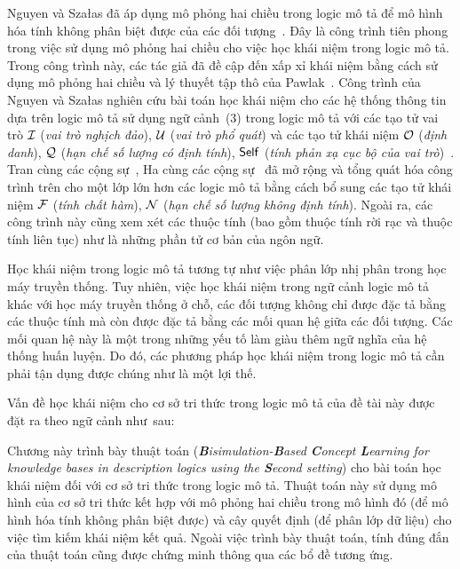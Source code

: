 Nguyen và Sza{\l}as đã áp dụng mô phỏng hai chiều trong logic mô tả để mô hình hóa tính không phân biệt được của các đối tượng~\cite{Nguyen2013}. Đây là công trình tiên phong trong việc sử dụng mô phỏng hai chiều cho việc học khái niệm trong logic mô tả. Trong công trình này, các tác giả đã đề cập đến xấp xỉ khái niệm bằng cách sử dụng mô phỏng hai chiều và lý thuyết tập thô của Pawlak~\cite{Pawlak1992,Pawlak2007}. 
Công trình của Nguyen và Sza{\l}as nghiên cứu bài toán học khái niệm cho các hệ thống thông tin dựa trên logic mô tả sử dụng ngữ cảnh~(3) trong logic mô tả \ALC với các tạo tử vai trò $\mathcal{I}$ ({\em vai trò nghịch đảo}), $\mathcal{U}$ ({\em vai trò phổ quát}) và các tạo tử khái niệm $\mathcal{O}$ ({\em định danh}), $\mathcal{Q}$ ({\em hạn chế số lượng có định tính}), $\mathsf{Self}$ ({\em tính phản xạ cục bộ của vai trò})~\cite{Nguyen2013}.
Tran cùng các cộng sự~\cite{Tran2012}, Ha cùng các cộng sự~\cite{Ha2012} đã mở rộng và tổng quát hóa công trình trên cho một lớp lớn hơn các logic mô tả bằng cách bổ sung các tạo tử khái niệm $\mathcal{F}$ ({\em tính chất hàm}), $\mathcal{N}$ ({\em hạn chế số lượng không định tính}). Ngoài ra, các công trình này cũng xem xét các thuộc tính (bao gồm thuộc tính rời rạc và thuộc tính liên tục) như là những phần tử cơ bản của ngôn ngữ.

Học khái niệm trong logic mô tả tương tự như việc phân lớp nhị phân trong học máy truyền thống. Tuy nhiên, việc học khái niệm trong ngữ cảnh logic mô tả khác với học máy truyền thống ở chỗ, các đối tượng không chỉ được đặc tả bằng các thuộc tính mà còn được đặc tả bằng các mối quan hệ giữa các đối tượng. Các mối quan hệ này là một trong những yếu tố làm giàu thêm ngữ nghĩa của hệ thống huấn luyện. Do đó, các phương pháp học khái niệm trong logic mô tả cần phải tận dụng được chúng như là một lợi thế.

Vấn đề học khái niệm cho cơ sở tri thức trong logic mô tả của đề tài này được đặt ra theo ngữ cảnh như~sau:

\noindent
{}

Chương này trình bày thuật toán {\em \BBCLearnS} ({\em \textbf{B}isimulation-\textbf{B}ased \textbf{C}oncept \textbf{L}earning for knowledge bases in description logics using the \textbf{S}econd setting}) cho bài toán học khái niệm đối với cơ sở tri thức trong logic mô tả. Thuật toán này sử dụng mô hình của cơ sở tri thức kết hợp với mô phỏng hai chiều trong mô hình đó (để mô hình hóa tính không phân biệt được) và cây quyết định (để phân lớp dữ liệu) cho việc tìm kiếm khái niệm kết quả. Ngoài việc trình bày thuật toán, tính đúng đắn của thuật toán cũng được chứng minh thông qua các bổ đề tương ứng.

